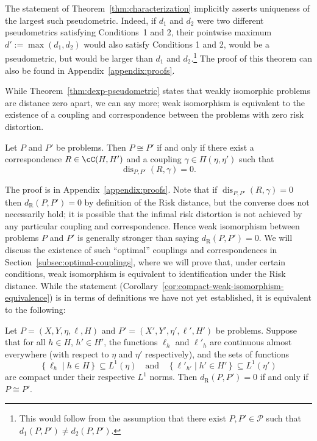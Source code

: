 \documentclass[twoside,11pt]{article}
\newcommand{\dexp}[1][]{d_{\mathrm{R}#1}}
\DeclareMathOperator{\dis}{dis}
\newcommand{\set}[2]{\left\{ #1\middle| #2\right\}}
\begin{document}
 

The statement of Theorem~\ref{thm:characterization} implicitly asserts uniqueness of the largest such pseudometric. Indeed, if $d_1$ and $d_2$ were two different pseudometrics satisfying Conditions~1 and 2, their pointwise maximum $d':=\max(d_1,d_2)$ would also satisfy Conditions 1 and 2, would be a pseudometric, but would be larger than $d_1$ and $d_2$.\footnote{This would follow from the assumption that there exist $P,P'\in\mathcal{P}$ such that $d_1(P,P')\neq d_2(P,P').$} The proof of this theorem can also be found in Appendix~\ref{appendix:proofs}. 

While Theorem~\ref{thm:dexp-pseudometric} states that weakly isomorphic problems are distance zero apart, we can say more; weak isomorphism is equivalent to the existence of a coupling and correspondence between the problems with zero risk distortion.
\begin{proposition}\label{prop:weak-iso-optimal}
    Let $P$ and $P'$ be problems. Then $P\cong P'$ if and only if there exist a correspondence $R\in \cC(H,H')$ and a coupling $\gamma \in \Pi(\eta,\eta')$ such that \[\dis_{P,P'}(R,\gamma)=0.\]
\end{proposition}

The proof is in Appendix~\ref{appendix:proofs}. Note that if $\dis_{P,P'}(R,\gamma)=0$ then $\dexp(P,P')=0$ by definition of the Risk distance, but the converse does not necessarily hold; it is possible that the infimal risk distortion is not achieved by any particular coupling and correspondence. Hence weak isomorphism between problems $P$ and $P'$ is generally stronger than saying $\dexp(P,P')=0$. We will discuss the existence of such ``optimal'' couplings and correspondences in Section~\ref{subsec:optimal-couplings}, where we will prove that, under certain conditions, weak isomorphism is equivalent to identification under the Risk distance. While the statement (Corollary~\ref{cor:compact-weak-isomorphism-equivalence}) is in terms of definitions we have not yet established, it is equivalent to the following:
\begin{proposition}\label{prop:drisk-zero-compact}
    Let $P = (X,Y,\eta,\ell,H)$ and $P' = (X',Y',\eta',\ell',H')$ be problems. Suppose that for all $h\in H$, $h'\in H'$, the functions $\ell_h$ and $\ell'_h$ are continuous almost everywhere (with respect to $\eta$ and $\eta'$ respectively), and the sets of functions
    \[\set{\ell_h}{h\in H}\subseteq L^1(\eta)\quad \text{and} \quad \set{\ell'_{h'}}{h'\in H'}\subseteq L^1(\eta')\] are compact under their respective $L^1$ norms. Then $\dexp(P,P')=0$ if and only if $P \cong P'$.
\end{proposition}
\end{document}
